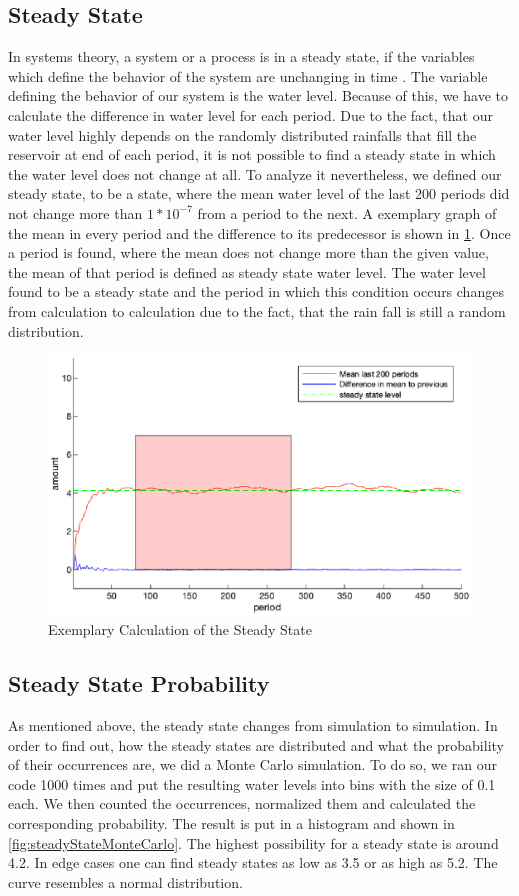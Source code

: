 \documentclass[12pt, a4paper, oneside]{article}
\begin{document}
\subsection{Steady State}
In systems theory, a system or a process is in a steady state, if the variables which define the behavior of the system are unchanging in time \citep{gagniuc2017markov}. 
The variable defining the behavior of our system is the water level. 
Because of this, we have to calculate the difference in water level for each period. 
Due to the fact, that our water level highly depends on the randomly distributed rainfalls that fill the reservoir at end of each period, it is not possible to find a steady state in which the water level does not change at all. %
To analyze it nevertheless, we defined our steady state, to be a state, where the mean water level of the last 200 periods did not change more than $1*10^{-7}$ from a period to the next.
A exemplary graph of the mean in every period and the difference to its predecessor is shown in \ref{fig:steadyState}.
Once a period is found, where the mean does not change more than the given value, the mean of that period is defined as steady state water level.
The water level found to be a steady state and the period in which this condition occurs changes from calculation to calculation due to the fact, that the rain fall is still a random distribution.
\begin{figure}[ht]
	\includegraphics[width=1\textwidth]{figures/steadyState.eps}
	\caption{Exemplary Calculation of the Steady State}
	\label{fig:steadyState}
\end{figure}
\subsection{Steady State Probability}
As mentioned above, the steady state changes from simulation to simulation.
In order to find out, how the steady states are distributed and what the probability of their occurrences are, we did a Monte Carlo simulation.
To do so, we ran our code 1000 times and put the resulting water levels into bins with the size of 0.1 each.
We then counted the occurrences, normalized them and calculated the corresponding probability.
The result is put in a histogram and shown in \ref{fig:steadyStateMonteCarlo}.
The highest possibility for a steady state is around 4.2. 
In edge cases one can find steady states as low as 3.5 or as high as 5.2. 
The curve resembles a normal distribution. 
\end{document}
